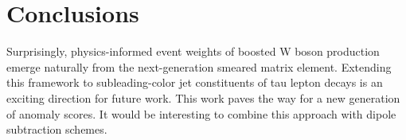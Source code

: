 \section{Conclusions}\label{sec:conclusions}

Surprisingly, physics-informed event weights of boosted W boson
production emerge naturally from the next-generation smeared matrix
element. Extending this framework to subleading-color jet constituents
of tau lepton decays is an exciting direction for future work. This work
paves the way for a new generation of anomaly scores. It would be
interesting to combine this approach with dipole subtraction schemes.

